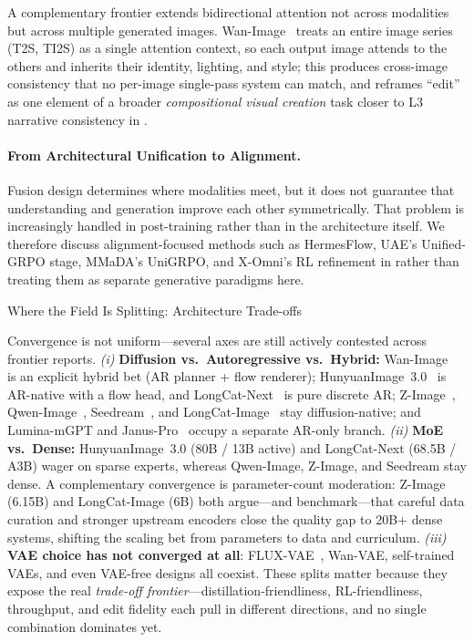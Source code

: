 A complementary frontier extends bidirectional attention not across modalities but across multiple generated images. Wan-Image~\citep{mao2026wan} treats an entire image series (T2S, TI2S) as a single attention context, so each output image attends to the others and inherits their identity, lighting, and style; this produces cross-image consistency that no per-image single-pass system can match, and reframes ``edit'' as one element of a broader \emph{compositional visual creation} task closer to L3 narrative consistency in .

\paragraph{From Architectural Unification to Alignment.}
Fusion design determines where modalities meet, but it does not guarantee that understanding and generation improve each other symmetrically. That problem is increasingly handled in post-training rather than in the architecture itself. We therefore discuss alignment-focused methods such as HermesFlow, UAE's Unified-GRPO stage, MMaDA's UniGRPO, and X-Omni's RL refinement in  rather than treating them as separate generative paradigms here.


\begin{highlightbox}{Where the Field Is Splitting: Architecture Trade-offs}

Convergence is not uniform---several axes are still actively contested across frontier reports. \emph{(i)} \textbf{Diffusion vs.\ Autoregressive vs.\ Hybrid:} Wan-Image~\citep{mao2026wan} is an explicit hybrid bet (AR planner + flow renderer); HunyuanImage~3.0~\citep{cao2025hunyuanimage} is AR-native with a flow head, and LongCat-Next~\citep{team2026longcat} is pure discrete AR; Z-Image~\citep{cai2025z}, Qwen-Image~\citep{wu2025qwen}, Seedream~\citep{seedream2025seedream}, and LongCat-Image~\citep{team2025longcat} stay diffusion-native; and Lumina-mGPT and Janus-Pro~\citep{chen2025janusprounifiedmultimodalunderstanding} occupy a separate AR-only branch. \emph{(ii)} \textbf{MoE vs.\ Dense:} HunyuanImage~3.0 (80B / 13B active) and LongCat-Next (68.5B / A3B) wager on sparse experts, whereas Qwen-Image, Z-Image, and Seedream stay dense. A complementary convergence is parameter-count moderation: Z-Image (6.15B) and LongCat-Image (6B) both argue---and benchmark---that careful data curation and stronger upstream encoders close the quality gap to 20B+ dense systems, shifting the scaling bet from parameters to data and curriculum. \emph{(iii)} \textbf{VAE choice has not converged at all}: FLUX-VAE~\citep{labs2025flux1kontextflowmatching}, Wan-VAE, self-trained VAEs, and even VAE-free designs all coexist. These splits matter because they expose the real \emph{trade-off frontier}---distillation-friendliness, RL-friendliness, throughput, and edit fidelity each pull in different directions, and no single combination dominates yet.
\end{highlightbox}


